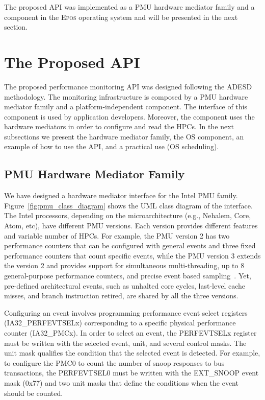 \documentclass[conference]{IEEEtran}
\newcommand{\figFull}[4][ht!]{
	\begin{figure*}[#1]
	{\centering{\texttt{[image: fig/\#2]}}\par}
	\caption{#3}
	\label{fig:#2}
	\end{figure*}
}
\begin{document}
The proposed API was implemented as a PMU hardware mediator family and a component in the \textsc{Epos} operating system and will be presented in the next section.

\section{The Proposed API}
\label{sec:proposed_api}

The proposed performance monitoring API was designed following the ADESD methodology. The monitoring infrastructure is composed by a PMU hardware mediator family and a platform-independent component. The interface of this component is used by application developers. Moreover, the component uses the hardware mediators in order to configure and read the HPCs. In the next subsections we present the hardware mediator family, the OS component, an example of how to use the API, and a practical use (OS scheduling). 

\subsection{PMU Hardware Mediator Family}

We have designed a hardware mediator interface for the Intel PMU family. Figure~\ref{fig:pmu_class_diagram} shows the UML class diagram of the interface. The Intel processors, depending on the microarchitecture (e.g., Nehalem, Core, Atom, etc), have different PMU versions. Each version provides different features and variable number of HPCs. For example, the PMU version 2 has two performance counters that can be configured with general events and three fixed performance counters that count specific events, while the PMU version 3 extends the version 2 and provides support for simultaneous multi-threading, up to 8 general-purpose performance counters, and precise event based sampling~\cite{intelsys}. Yet, pre-defined architectural events, such as unhalted core cycles, last-level cache misses, and branch instruction retired, are shared by all the three versions.

\figFull{pmu_class_diagram}{UML class diagram for the proposed PMU hardware mediator API.}{scale=.35}

Configuring an event involves programming performance event select registers (IA32\_PERFEVTSELx) corresponding to a specific physical performance counter (IA32\_PMCx). In order to select an event, the PERFEVTSELx register must be written with the selected event, unit, and several control masks. The unit mask qualifies the condition that the selected event is detected. For example, to configure the PMC0 to count the number of snoop responses to bus transactions, the PERFEVTSEL0 must be written with the EXT\_SNOOP event mask (0x77) and two unit masks that define the conditions when the event should be counted. 
\end{document}
